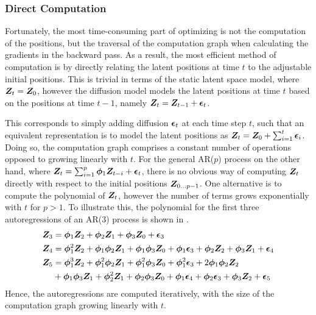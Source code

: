    \subsubsection{Direct Computation}
    
        Fortunately, the most time-consuming part of optimizing is not the computation of the positions, but the traversal of the computation graph when calculating the gradients in the backward pass. As a result, the most efficient method of computation is by directly relating the latent positions at time $t$ to the adjustable initial positions. 
        This is trivial in terms of the static latent space model, where $\bm{Z}_t=\bm{Z}_0$, however the diffusion model models the latent positions at time $t$ based on the positions at time $t-1$, namely $\bm{Z}_t=\bm{Z}_{t-1}+\bm{\epsilon}_t$.
        
        This corresponds to simply adding diffusion $\bm{\epsilon}_t$ at each time step $t$, such that an equivalent representation is to model the latent positions as $\bm{Z}_t=\bm{Z}_0+\sum_{i=1}^t\bm{\epsilon}_i$. Doing so, the computation graph comprises a constant number of operations opposed to growing linearly with $t$.
        For the general AR($p$) process on the other hand, where $\bm{Z}_t=\sum_{i=1}^p \bm{\phi}_1 \bm{Z}_{t-i} + \bm{\epsilon}_t$, there is no obvious way of computing $\bm{Z}_t$ directly with respect to the initial positions $\bm{Z}_{0\dots p-1}$. One alternative is to compute the polynomial of $\bm{Z}_t$, however the number of terms grows exponentially with $t$ for $p>1$. To illustrate this, the polynomial for the first three autoregressions of an AR(3) process is shown in .
        \begin{equation}\label{eq:pyimpl-ar-polynomial}
        \begin{split}
            \bm{Z}_3 &= \bm{\phi}_1\bm{Z}_2 + \bm{\phi}_2\bm{Z}_1 + \bm{\phi}_3\bm{Z}_0 + \bm{\epsilon}_3 \\
            \bm{Z}_4 &= \bm{\phi}_1^2\bm{Z}_2 + \bm{\phi}_1\bm{\phi}_2\bm{Z}_1 + \bm{\phi}_1\bm{\phi}_3\bm{Z}_0 + \bm{\phi}_1\bm{\epsilon}_3 + \bm{\phi}_2\bm{Z}_2 + \bm{\phi}_3\bm{Z}_1 + \bm{\epsilon}_4 \\
            \bm{Z}_5 &= \bm{\phi}_1^3\bm{Z}_2 + \bm{\phi}_1^2\bm{\phi}_2\bm{Z}_1 + \bm{\phi}_1^2\bm{\phi}_3\bm{Z}_0 + \bm{\phi}_1^2\bm{\epsilon}_3 + 2\bm{\phi}_1\bm{\phi}_2\bm{Z}_2 \\
                &+ \bm{\phi}_1\bm{\phi}_3\bm{Z}_1 + \bm{\phi}_2^2\bm{Z}_1 + \bm{\phi}_2\bm{\phi}_3\bm{Z}_0 + \bm{\phi}_1\bm{\epsilon}_4 + \bm{\phi}_2\bm{\epsilon}_3 + \bm{\phi}_3\bm{Z}_2 + \bm{\epsilon}_5
        \end{split}
        \end{equation}
        Hence, the autoregressions are computed iteratively, with the size of the computation graph growing linearly with $t$.
        
